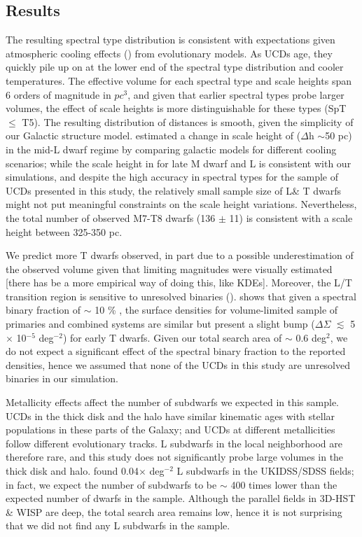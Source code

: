 \documentclass[manuscript]{aastex63}
\begin{document}
\subsection{Results}

The resulting spectral type distribution is consistent with expectations given atmospheric cooling effects (\citealt{2004ApJS..155..191B}) from evolutionary models. As UCDs age, they quickly pile up on at the lower end of the spectral type distribution and cooler temperatures. The effective volume for each spectral type and scale heights span 6 orders of magnitude in $pc^3$, and given that earlier spectral types probe larger volumes, the effect of scale heights is more distinguishable for these types (SpT $\leq$ T5). The resulting distribution of distances is smooth, given the simplicity of our Galactic structure model. \cite{Ryan2017} estimated a change in scale height of ($\Delta$h $\sim$50 pc) in the mid-L dwarf regime by comparing galactic models for different cooling scenarios; while the scale height in for late M dwarf and L is consistent with our simulations, and despite the high accuracy in spectral types for the sample of UCDs presented in this study, the relatively small sample size of L\& T dwarfs might not put meaningful constraints on the scale height variations. Nevertheless, the total number of observed M7-T8 dwarfs (136 $\pm$ 11) is consistent with a scale height between 325-350 pc. 


We predict more T dwarfs  observed, in part due to a possible underestimation of the observed volume given that limiting magnitudes were visually estimated [there has be a more empirical way of doing this, like KDEs]. Moreover, the L/T transition region is sensitive to unresolved binaries (\citealt{2014ApJ...794..143B}). \cite{2007ApJ...659..655B} shows that given a spectral binary fraction of $\sim$ 10 \% , the surface densities for volume-limited sample of primaries and combined systems are similar but present a slight bump ($\Delta \Sigma$ $\lesssim$ 5$\times$ 10$^{-5}$ deg$^{-2}$) for early T dwarfs. Given our total search area of $\sim$ 0.6 deg$^2$, we do not expect a significant effect of the spectral binary fraction to the reported densities, hence we assumed that none of the UCDs  in this study are unresolved binaries in our simulation.

Metallicity effects affect the number of subdwarfs we expected in this sample. UCDs in the thick disk and the halo have similar kinematic ages with stellar populations in these parts of the Galaxy; and UCDs at different metallicities follow different evolutionary tracks. L subdwarfs in the local neighborhood are therefore rare, and this study does not significantly probe large volumes in the thick disk and halo. \cite{Lodieu2017} found 0.04$\times$ deg$^{-2}$ L subdwarfs in the UKIDSS/SDSS fields; in fact, we expect the number of subdwarfs to be $\sim$ 400 times lower than the expected number of dwarfs in the sample. Although the parallel fields in 3D-HST \& WISP are deep, the total search area remains low, hence it is not surprising that we did not find any L subdwarfs in the sample. 
\end{document}
